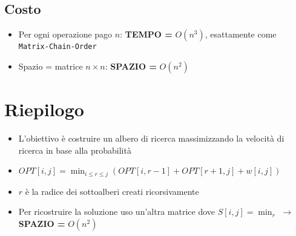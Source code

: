 \subsection{Costo}

\begin{itemize}
  \item
        Per ogni operazione pago $n$: \textbf{TEMPO =} $O(n^3)$, esattamente
        come \texttt{Matrix-Chain-Order}
  \item
        Spazio = matrice $n \times n$: \textbf{SPAZIO =} $O(n^2)$
\end{itemize}

\section{Riepilogo}

\begin{itemize}
  \item
        L'obiettivo è costruire un albero di ricerca massimizzando la velocità
        di ricerca in base alla probabilità
  \item
        $OPT[i,j] = \min_{i \le r \le j} (OPT[i, r-1] + OPT[r+1, j] + w[i,j])$
  \item
        $r$ è la radice dei sottoalberi creati ricorsivamente
  \item
        Per ricostruire la soluzione uso un'altra matrice dove
        $S[i,j] = \min_r$ $\rightarrow$ \textbf{SPAZIO =} $O(n^2)$
\end{itemize}
